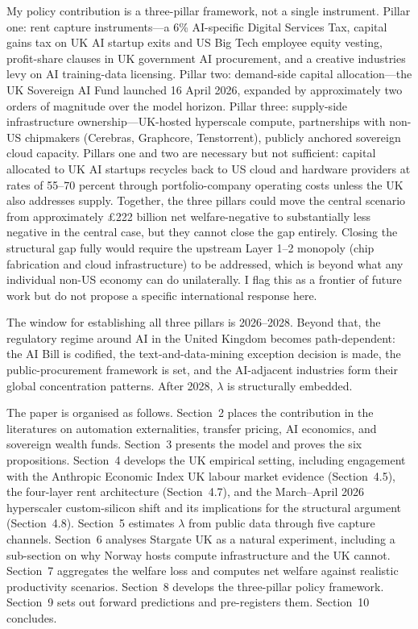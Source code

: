\documentclass[11pt,letterpaper]{article}
\theoremstyle{remark}
\begin{document}
My policy contribution is a three-pillar framework, not a single instrument. Pillar one: rent capture instruments---a 6\% {AI}-specific Digital Services Tax, capital gains tax on {UK} {AI} startup exits and {US} Big Tech employee equity vesting, profit-share clauses in {UK} government {AI} procurement, and a creative industries levy on {AI} training-data licensing. Pillar two: demand-side capital allocation---the {UK} Sovereign {AI} Fund launched 16 April 2026, expanded by approximately two orders of magnitude over the model horizon. Pillar three: supply-side infrastructure ownership---{UK}-hosted hyperscale compute, partnerships with non-{US} chipmakers ({Cerebras}, {Graphcore}, {Tenstorrent}), publicly anchored sovereign cloud capacity. Pillars one and two are necessary but not sufficient: capital allocated to {UK} {AI} startups recycles back to {US} cloud and hardware providers at rates of 55--70 percent through portfolio-company operating costs unless the {UK} also addresses supply. Together, the three pillars could move the central scenario from approximately \pounds222 billion net welfare-negative to substantially less negative in the central case, but they cannot close the gap entirely. Closing the structural gap fully would require the upstream Layer 1--2 monopoly (chip fabrication and cloud infrastructure) to be addressed, which is beyond what any individual non-{US} economy can do unilaterally. I flag this as a frontier of future work but do not propose a specific international response here.

The window for establishing all three pillars is 2026--2028. Beyond that, the regulatory regime around {AI} in the United Kingdom becomes path-dependent: the {AI} Bill is codified, the text-and-data-mining exception decision is made, the public-procurement framework is set, and the {AI}-adjacent industries form their global concentration patterns. After 2028, $\lambda$ is structurally embedded.

The paper is organised as follows. Section~2 places the contribution in the literatures on automation externalities, transfer pricing, {AI} economics, and sovereign wealth funds. Section~3 presents the model and proves the six propositions. Section~4 develops the {UK} empirical setting, including engagement with the {Anthropic Economic Index} {UK} labour market evidence (Section~4.5), the four-layer rent architecture (Section~4.7), and the March--April 2026 hyperscaler custom-silicon shift and its implications for the structural argument (Section~4.8). Section~5 estimates $\lambda$ from public data through five capture channels. Section~6 analyses Stargate {UK} as a natural experiment, including a sub-section on why Norway hosts compute infrastructure and the {UK} cannot. Section~7 aggregates the welfare loss and computes net welfare against realistic productivity scenarios. Section~8 develops the three-pillar policy framework. Section~9 sets out forward predictions and pre-registers them. Section~10 concludes.
\end{document}
